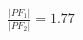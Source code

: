 \documentclass[preview]{standalone}
\begin{document}
\begin{align*}
\frac{|PF_1|}{|PF_2|} = 1.77
\end{align*}
\end{document}
